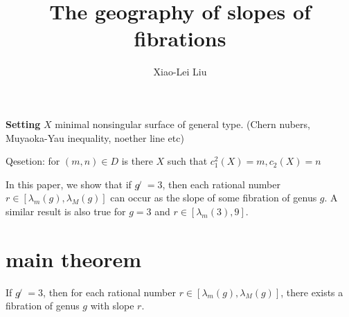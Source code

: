 \documentclass{article}
\title{The geography of slopes of fibrations}
\author{Xiao-Lei Liu}
\begin{document}
\maketitle
\textbf{Setting}
$X$ minimal nonsingular surface of general type.  (Chern nubers, Muyaoka-Yau inequality, noether line etc)

Qesetion: for $ (m,n)\in D $ is there $X$ such that $ c_{1}^{2}(X)=m, c_{2}(X)=n $ 

In this paper, we show that if $g ̸= 3$, then each rational number $r \in [\lambda_{m}(g), \lambda_{M}(g)]$ can occur as the slope of some fibration of genus $g$. A similar result is also true for $g = 3$ and $r \in [\lambda_{m}(3), 9]$.

\section{main theorem}
If $g ̸= 3$, then for each rational number $r \in [\lambda_{m}(g), \lambda_{M}(g)]$, there exists a fibration of genus $g$ with slope $r$.
\end{document}
